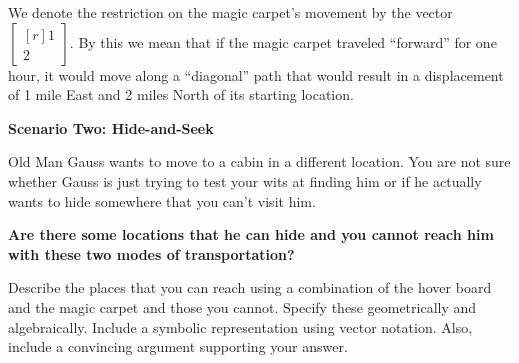 \documentclass{problemset}
\newcommand{\mat}[1]{\begin{bmatrix*}[r]#1\end{bmatrix*}}
\begin{document}
\begin{iola}
\begin{minipage}{\textwidth}
	We denote the restriction on the magic carpet's movement by the vector
	$\mat{1 \\2 }$. By this we mean that if the
	magic carpet traveled ``forward'' for one hour, it would move along a
	``diagonal'' path that would result in a displacement of 1 mile East and
	2 miles North of its starting location.
	\vspace{1cm}
\end{minipage}



\textbf{Scenario Two: Hide-and-Seek}

Old Man Gauss wants to move to a cabin in a different location. You are
not sure whether Gauss is just trying to test your wits at finding him
or if he actually wants to hide somewhere that you can't visit him.

\vspace{5mm}

\textbf{Are there some locations that he can hide and you cannot reach him
with these two modes of transportation?}

Describe the places that you
can reach using a combination of the hover board and the magic carpet and
those you cannot. Specify these geometrically and algebraically. Include
a symbolic representation using vector notation. Also, include a convincing
argument supporting your answer.

\end{iola}
\end{document}

